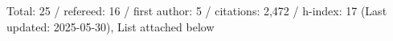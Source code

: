 Total: 25 / refereed: 16 / first author: 5 / citations: 2,472 / h-index: 17 (Last updated: 2025-05-30), List attached below